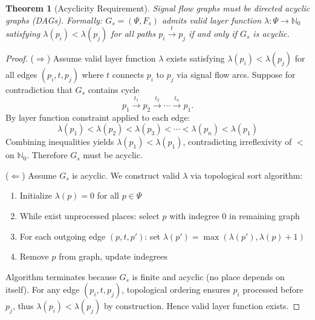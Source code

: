 \documentclass[10pt,letterpaper]{article}
\newtheorem{theorem}{Theorem}
\begin{document}
\begin{theorem}[Acyclicity Requirement]
Signal flow graphs must be directed acyclic graphs (DAGs). Formally: $G_s = (\Psi, F_s)$ admits valid layer function
$\lambda: \Psi \rightarrow \mathbb{N}_0$
satisfying $\lambda(p_i) < \lambda(p_j)$ for all paths $p_i \xrightarrow{t} p_j$ if and only if $G_s$ is acyclic.
\end{theorem}

\begin{proof}
($\Rightarrow$) Assume valid layer function $\lambda$ exists satisfying $\lambda(p_i) < \lambda(p_j)$ for all edges $(p_i,t,p_j)$ where $t$ connects $p_i$ to $p_j$ via signal flow arcs. Suppose for contradiction that $G_s$ contains cycle
\[
p_1 \xrightarrow{t_1} p_2 \xrightarrow{t_2} \cdots \xrightarrow{t_n} p_1.
\]
By layer function constraint applied to each edge:
\begin{equation*}
\lambda(p_1) < \lambda(p_2) < \lambda(p_3) < \cdots < \lambda(p_n) < \lambda(p_1)
\end{equation*}
Combining inequalities yields $\lambda(p_1) < \lambda(p_1)$, contradicting irreflexivity of $<$ on $\mathbb{N}_0$. Therefore $G_s$ must be acyclic.

($\Leftarrow$) Assume $G_s$ is acyclic. We construct valid $\lambda$ via topological sort algorithm:
\begin{enumerate}
\item Initialize $\lambda(p) = 0$ for all $p \in \Psi$
\item While exist unprocessed places: select $p$ with indegree 0 in remaining graph
\item For each outgoing edge $(p,t,p')$: set $\lambda(p') = \max(\lambda(p'), \lambda(p) + 1)$
\item Remove $p$ from graph, update indegrees
\end{enumerate}
Algorithm terminates because $G_s$ is finite and acyclic (no place depends on itself). For any edge $(p_i,t,p_j)$, topological ordering ensures $p_i$ processed before $p_j$, thus
$\lambda(p_i) < \lambda(p_j)$
by construction. Hence valid layer function exists.
\end{proof}
\end{document}
